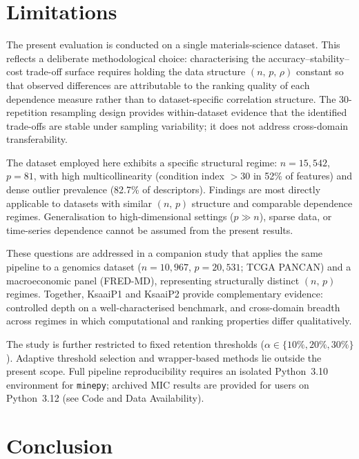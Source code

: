 \documentclass[twoside,11pt]{article}
\begin{document}
\section{Limitations}
The present evaluation is conducted on a single materials-science dataset.
This reflects a deliberate methodological choice: characterising the
accuracy--stability--cost trade-off surface requires holding the data
structure $(n,\, p,\, \rho)$ constant so that observed differences are
attributable to the ranking quality of each dependence measure rather than
to dataset-specific correlation structure. The 30-repetition resampling
design provides within-dataset evidence that the identified trade-offs are
stable under sampling variability; it does not address cross-domain
transferability.

The dataset employed here exhibits a specific structural regime:
$n = 15{,}542$, $p = 81$, with high multicollinearity (condition index
$> 30$ in 52\% of features) and dense outlier prevalence (82.7\% of
descriptors). Findings are most directly applicable to datasets with
similar $(n,\, p)$ structure and comparable dependence regimes.
Generalisation to high-dimensional settings ($p \gg n$), sparse data, or
time-series dependence cannot be assumed from the present results.

These questions are addressed in a companion study \citep{ngorima2026complexity} that
applies the same pipeline to a genomics dataset
($n = 10{,}967$, $p = 20{,}531$; TCGA PANCAN) and a macroeconomic panel
(FRED-MD), representing structurally distinct $(n,\, p)$ regimes. Together,
KsaaiP1 and KsaaiP2 provide complementary evidence: controlled depth on a
well-characterised benchmark, and cross-domain breadth across regimes in
which computational and ranking properties differ qualitatively.

The study is further restricted to fixed retention thresholds
($\alpha \in \{10\%, 20\%, 30\%\}$). Adaptive threshold selection and
wrapper-based methods lie outside the present scope.
Full pipeline reproducibility requires an isolated Python~3.10 environment
for \texttt{minepy}; archived MIC results are provided for users on
Python~3.12 (see Code and Data Availability).

\section{Conclusion}
\end{document}
